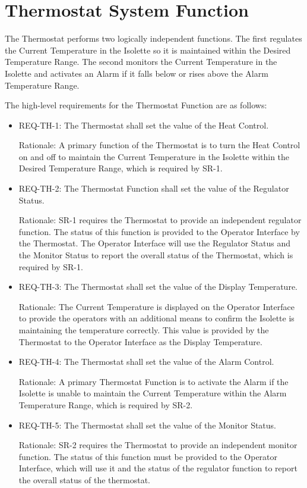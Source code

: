 \chapter{Thermostat System Function}
\label{chap:thermostat-system-function}

The Thermostat performs two logically independent functions. The first regulates the Current
Temperature in the Isolette so it is maintained within the Desired Temperature Range. The
second monitors the Current Temperature in the Isolette and activates an Alarm if it falls below
or rises above the Alarm Temperature Range.

The high-level requirements for the Thermostat Function are as follows:

\begin{itemize}
\item REQ-TH-1: The Thermostat shall set the value of the Heat Control.

      Rationale: A primary function of the Thermostat is to turn the Heat Control on and off to
      maintain the Current Temperature in the Isolette within the Desired Temperature Range,
      which is required by SR-1.
\item REQ-TH-2: The Thermostat Function shall set the value of the Regulator Status.

      Rationale: SR-1 requires the Thermostat to provide an independent regulator function.
      The status of this function is provided to the Operator Interface by the Thermostat. The
      Operator Interface will use the Regulator Status and the Monitor Status to report the
      overall status of the Thermostat, which is required by SR-1.
\item REQ-TH-3: The Thermostat shall set the value of the Display Temperature.

      Rationale: The Current Temperature is displayed on the Operator Interface to provide
      the operators with an additional means to confirm the Isolette is maintaining the
      temperature correctly. This value is provided by the Thermostat to the Operator Interface
      as the Display Temperature.
\item REQ-TH-4: The Thermostat shall set the value of the Alarm Control.

      Rationale: A primary Thermostat Function is to activate the Alarm if the Isolette is
      unable to maintain the Current Temperature within the Alarm Temperature Range, which
      is required by SR-2.
\item REQ-TH-5: The Thermostat shall set the value of the Monitor Status.

      Rationale: SR-2 requires the Thermostat to provide an independent monitor function.
      The status of this function must be provided to the Operator Interface, which will use it
      and the status of the regulator function to report the overall status of the thermostat.
\end{itemize}

